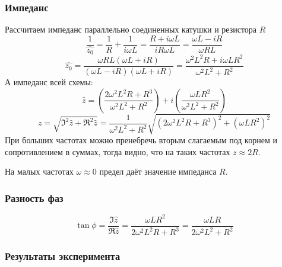 \subsubsection{Импеданс}
Рассчитаем импеданс параллельно соединенных катушки и резистора $R$
\begin{equation}
	\frac{1}{\hat{z_0}}=\frac{1}{R}+\frac{1}{i\omega L}=\frac{R+i\omega L}{iR\omega L}=\frac{\omega L - iR}{\omega R L}
\end{equation}
\begin{equation}
	\hat{z_0}=\frac{\omega R L(\omega L + iR)}{(\omega L - iR)(\omega L + iR)}=
	\frac{\omega^2L^2 R +i\omega L R^2}{\omega^2L^2+R^2}
\end{equation}
А импеданс всей схемы:
\begin{equation}
	\hat{z}=
	\left(
	\frac{2\omega^2L^2 R+R^3}{\omega^2L^2+R^2}
	\right)+
	i
	\left(
	\frac{\omega L R^2}{\omega^2L^2+R^2}
	\right)
\end{equation}
\begin{equation}
	z=\sqrt{\Im^2\hat{z}+\Re^2\hat{z}}=
	\frac{1}{\omega^2L^2+R^2}\sqrt{
	\left(
	2\omega^2L^2 R+R^3
	\right)^2+
	\left(
	\omega L R^2
	\right)^2
	}
\end{equation}
При больших частотах можно пренебречь вторым слагаемым под корнем и сопротивлением в суммах, тогда видно, что на таких частотах $z\approx 2R$.

На малых частотах $\omega\approx0$ предел даёт значение импеданса $R$.
\subsubsection{Разность фаз}
\begin{equation}
	\tan\phi = \frac{\Im\hat{z}}{\Re\hat{z}}=
	\frac{
		\omega L R^2
	}{
		2\omega^2L^2 R+R^3
	}=
	\frac{
		\omega LR
	}{
		2\omega^2L^2 +R^2
	}	
\end{equation}

\subsubsection{Результаты эксперимента}


